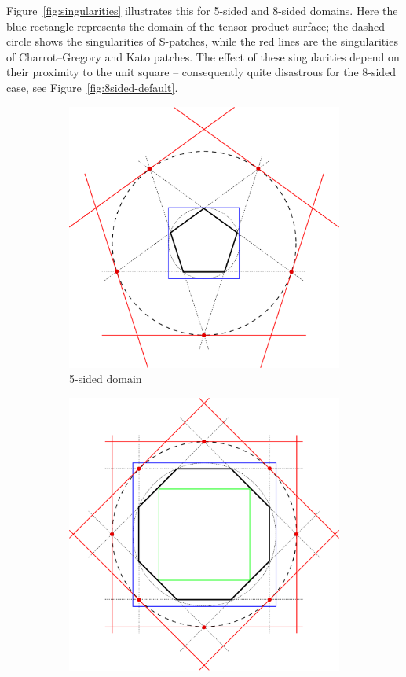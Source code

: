 \documentclass[9pt,academicons]{article}
\begin{document}
Figure~\ref{fig:singularities} illustrates this for 5-sided and 8-sided domains.
Here the blue rectangle represents the domain of the tensor product surface;
the dashed circle shows the singularities of S-patches,
while the red lines are the singularities of Charrot--Gregory and Kato patches.
The effect of these singularities depend on their proximity to the unit square
-- consequently quite disastrous for the 8-sided case,
see Figure~\ref{fig:8sided-default}.
\begin{figure}
  \begin{subfigure}{.45\textwidth}
    \includegraphics[width=\textwidth]{images/singularities.pdf}
    \caption{5-sided domain}
    \label{fig:singularities5}
  \end{subfigure}
  \hfill
  \begin{subfigure}{.45\textwidth}
    \includegraphics[width=\textwidth]{images/singularities2.pdf}

\end{subfigure}
\end{figure}
\end{document}
